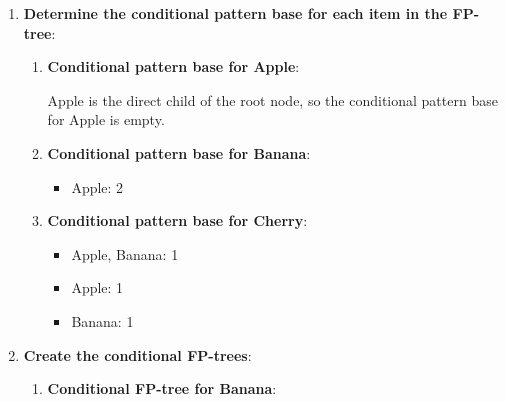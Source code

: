\documentclass[
english,
smallborders
]{i6prcsht}
\begin{document}
\begin{solution}
\begin{enumerate}
\begin{enumerate}
		      \end{enumerate}

		\item \textbf{Determine the conditional pattern base for each item in the FP-tree}:


		      \begin{enumerate}
			      \item \textbf{Conditional pattern base for Apple}:

			            Apple is the direct child of the root node, so the conditional pattern base for Apple is empty.

			      \item \textbf{Conditional pattern base for Banana}:

			            \begin{itemize}
				            \item Apple: 2
			            \end{itemize}

			      \item \textbf{Conditional pattern base for Cherry}:

			            \begin{itemize}
				            \item Apple, Banana: 1
				            \item Apple: 1
				            \item Banana: 1
			            \end{itemize}

		      \end{enumerate}

		\item \textbf{Create the conditional FP-trees}:

		      \begin{enumerate}
			      \item \textbf{Conditional FP-tree for Banana}:

			            \begin{center}
\end{center}
\end{enumerate}
\end{enumerate}
\end{solution}
\end{document}
